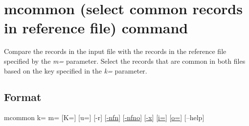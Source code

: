\documentclass[a4paper]{jarticle}
\begin{document}
\setlength{\baselineskip}{4mm}

\section*{mcommon (select common records in reference file) command}
Compare the records in the input file with the records in the reference file specified by the \emph{m=} parameter. Select the records that are common in both files based on the key specified in the \emph{k=} parameter. 

\subsection*{Format}
mcommon  k= m= [K=] [u=] [-r] 
[\href{run:option.pdf}{-nfn}] 
[\href{run:option.pdf}{-nfno}] 
[\href{run:option.pdf}{-x}] 
[\href{run:option.pdf}{i=}] 
[\href{run:option.pdf}{o=}] 
[--help]\\
\end{document}
